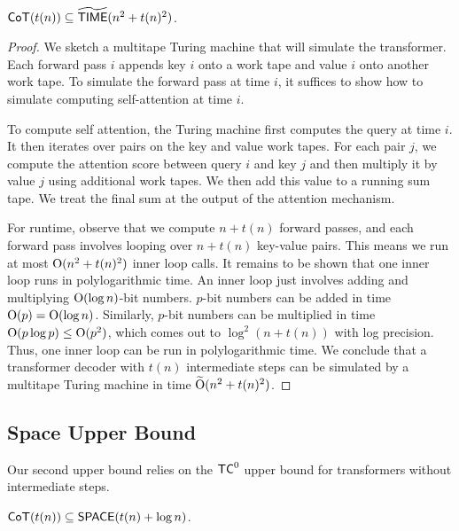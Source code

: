\begin{theorem} \label{thm:naive-upper-bound}
    $\mathsf{CoT}(t(n)) \subseteq \widetilde{\mathsf{TIME}}(n^2 + t(n)^2)$.
\end{theorem}
\begin{proof}
We sketch a multitape Turing machine that will simulate the transformer. Each forward pass $i$ appends key $i$ onto a work tape and value $i$ onto another work tape. To simulate the forward pass at time $i$, it suffices to show how to simulate computing self-attention at time $i$.

To compute self attention, the Turing machine first computes the query at time $i$. It then iterates over pairs on the key and value work tapes. For each pair $j$, we compute the attention score between query $i$ and key $j$ and then multiply it by value $j$ using additional work tapes. We then add this value to a running sum tape.
We treat the final sum at the output of the attention mechanism.

For runtime, observe that we compute $n + t(n)$ forward passes, and each forward pass involves looping over $n + t(n)$ key-value pairs. This means we run at most $\mathrm{O}(n^2 + t(n)^2)$ inner loop calls.
It remains to be shown that one inner loop runs in polylogarithmic time.
An inner loop just involves adding and multiplying $\mathrm{O}(\log n)$-bit numbers.
$p$-bit numbers can be added in time $\mathrm{O}(p) = \mathrm{O}(\log n)$.
Similarly, $p$-bit numbers can be multiplied in time $\mathrm{O}(p \log p) \leq \mathrm{O}(p^2)$, which comes out to $\log^2 (n + t(n))$ with log precision.
Thus, one inner loop can be run in polylogarithmic time.
We conclude that a transformer decoder with $t(n)$ intermediate steps can be simulated by a multitape Turing machine in time $\widetilde{\mathrm{O}}(n^2 + t(n)^2)$.
\end{proof}

\subsection{Space Upper Bound}

Our second upper bound relies on the $\mathsf{TC}^0$ upper bound for transformers without intermediate steps.

\begin{theorem} \label{thm:space-ub}
    $\mathsf{CoT}(t(n)) \subseteq \mathsf{SPACE}(t(n) + \log n)$.
\end{theorem}

